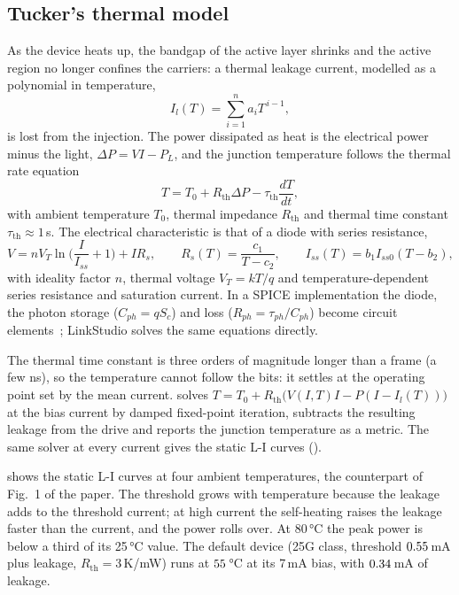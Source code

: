 \subsection{Tucker's thermal model}
As the device heats up, the bandgap of the active layer shrinks and the active region no longer
confines the carriers: a thermal leakage current, modelled as a polynomial in temperature,
\begin{equation}
  I_l(T)=\sum_{i=1}^{n}a_iT^{\,i-1},
\end{equation}
is lost from the injection. The power dissipated as heat is the electrical power minus the light,
$\Delta P=VI-P_L$, and the junction temperature follows the thermal rate equation
\begin{equation}
  T=T_0+R_{\mathrm{th}}\Delta P-\tau_{\mathrm{th}}\frac{dT}{dt},
\end{equation}
with ambient temperature $T_0$, thermal impedance $R_{\mathrm{th}}$ and thermal time constant
$\tau_{\mathrm{th}}\approx1$\,\textmu s. The electrical characteristic is that of a diode with series resistance,
\begin{equation}
  V=nV_T\ln\Big(\frac{I}{I_{ss}}+1\Big)+IR_s,\qquad R_s(T)=\frac{c_1}{T-c_2},\qquad I_{ss}(T)=b_1I_{ss0}(T-b_2),
\end{equation}
with ideality factor $n$, thermal voltage $V_T=kT/q$ and temperature-dependent series resistance
and saturation current. In a SPICE implementation the diode, the photon storage ($C_{ph}=qS_c$) and
loss ($R_{ph}=\tau_{ph}/C_{ph}$) become circuit elements~\cite{shi2009}; LinkStudio solves the same
equations directly.

\begin{incode}
The thermal time constant is three orders of magnitude longer than a frame (a few ns), so the
temperature cannot follow the bits: it settles at the operating point set by the mean current.
 solves $T=T_0+R_{\mathrm{th}}\big(V(I,T)I-P(I-I_l(T))\big)$ at the bias current by damped
fixed-point iteration, subtracts the resulting leakage from the drive and reports the junction
temperature as a metric. The same solver at every current gives the static L-I curves
().
\end{incode}

 shows the static L-I curves at four ambient temperatures, the counterpart of
Fig.~1 of the paper. The threshold grows with temperature because the leakage adds to the
threshold current; at high current the self-heating raises the leakage faster than the current,
and the power rolls over. At 80\,°C the peak power is below a third of its 25\,°C value. The default
device (25G class, threshold $0.55$\,mA plus leakage, $R_{\mathrm{th}}=3$\,K/mW) runs at
$55$\,°C at its 7\,mA bias, with $0.34$\,mA of leakage.


